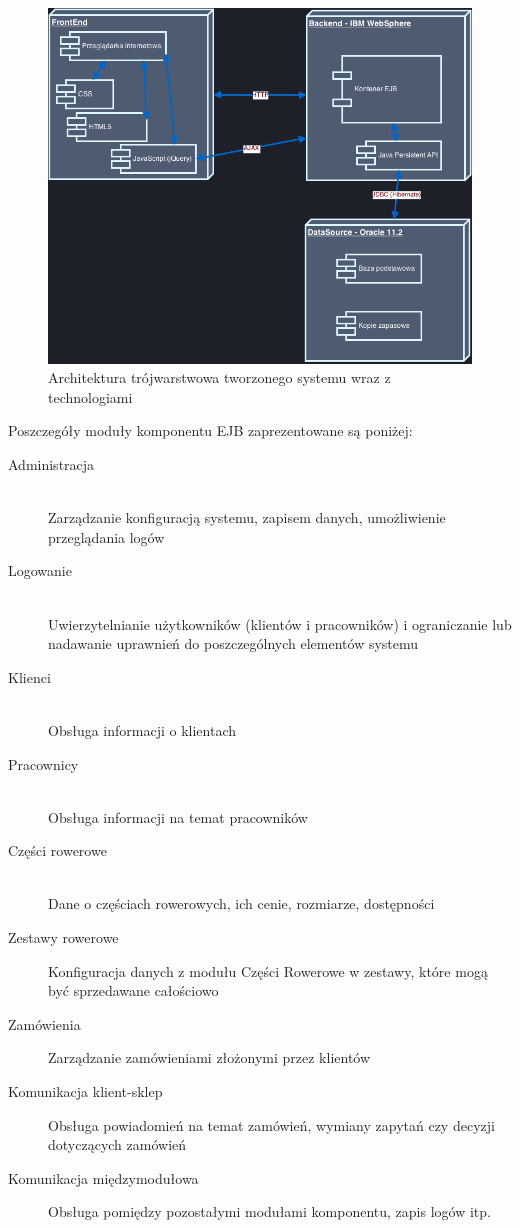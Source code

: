 \newpage
\begin{figure}[h!]
    \includegraphics[width=\textwidth,
    height=0.5\textheight]{graphics/component.png}
  \caption{Architektura trójwarstwowa tworzonego systemu wraz z technologiami}
\end{figure}

Poszczegóły moduły komponentu EJB zaprezentowane są poniżej:
\begin{description}
  \item[Administracja] \hfill \\
  	Zarządzanie konfiguracją systemu, zapisem danych, umożliwienie przeglądania
  	logów
  \item[Logowanie] \hfill \\
  	Uwierzytelnianie użytkowników (klientów i pracowników) i ograniczanie lub
  	nadawanie uprawnień do poszczególnych elementów systemu
  \item[Klienci] \hfill \\
  	Obsługa informacji o klientach
  \item[Pracownicy] \hfill \\
    Obsługa informacji na temat pracowników
  \item[Części rowerowe] \hfill \\
  	Dane o częściach rowerowych, ich cenie, rozmiarze, dostępności
  \item[Zestawy rowerowe]
    Konfiguracja danych z modułu Części Rowerowe w zestawy, które mogą być
    sprzedawane całościowo
  \item[Zamówienia]
    Zarządzanie zamówieniami złożonymi przez klientów
  \item[Komunikacja klient-sklep]
    Obsługa powiadomień na temat zamówień, wymiany zapytań czy decyzji
    dotyczących zamówień
  \item[Komunikacja międzymodułowa]
    Obsługa pomiędzy pozostałymi modułami komponentu, zapis logów itp.
\end{description}


